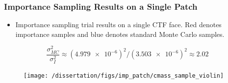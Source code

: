\documentclass[t, pdftex]{beamer}
\begin{document}
\begin{frame}
\frametitle{\small Importance Sampling Results on a Single Patch}
\vspace{-18pt}
\begin{itemize}
    \item Importance sampling trial results on a single CTF face. {\color{utred}Red} denotes importance samples and {\color{utblue}blue} denotes standard Monte Carlo samples.  
\end{itemize}
\[ \frac{\sigma^2_{MC}}{\sigma^2_{I}} \approx (\num{4.979e-6})^2 / (\num{3.503e-6})^2  \approx 2.02 \]
\vspace{-12pt}

\begin{figure}[]
    \centering
    \texttt{[image: /dissertation/figs/imp\_patch/cmass\_sample\_violin]}\\
    \label{model_overview}
\end{figure}
\end{frame}
\end{document}
